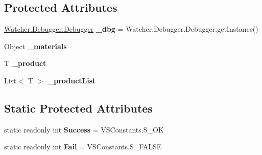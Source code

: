 \subsection*{Protected Attributes}
\begin{DoxyCompactItemize}
\item 
\hypertarget{classlib_wather_debugger_1_1_item_factory_3_01_t_01_4_a379e7c653f474dfa60015a2143bda733}{\hyperlink{class_watcher_1_1_debugger_1_1_debugger}{Watcher.\+Debugger.\+Debugger} {\bfseries \+\_\+dbg} = Watcher.\+Debugger.\+Debugger.\+get\+Instance()}\label{classlib_wather_debugger_1_1_item_factory_3_01_t_01_4_a379e7c653f474dfa60015a2143bda733}

\item 
\hypertarget{classlib_wather_debugger_1_1_item_factory_3_01_t_01_4_a1e0dcbf5d66f8fae7fddabdc60f4bc94}{Object {\bfseries \+\_\+materials}}\label{classlib_wather_debugger_1_1_item_factory_3_01_t_01_4_a1e0dcbf5d66f8fae7fddabdc60f4bc94}

\item 
\hypertarget{classlib_wather_debugger_1_1_item_factory_3_01_t_01_4_adcd525d89e1a7f17038dfddf95f8c665}{T {\bfseries \+\_\+product}}\label{classlib_wather_debugger_1_1_item_factory_3_01_t_01_4_adcd525d89e1a7f17038dfddf95f8c665}

\item 
\hypertarget{classlib_wather_debugger_1_1_item_factory_3_01_t_01_4_a7725a6c8d761884792f5700c92c138e6}{List$<$ T $>$ {\bfseries \+\_\+product\+List}}\label{classlib_wather_debugger_1_1_item_factory_3_01_t_01_4_a7725a6c8d761884792f5700c92c138e6}

\end{DoxyCompactItemize}
\subsection*{Static Protected Attributes}
\begin{DoxyCompactItemize}
\item 
\hypertarget{classlib_wather_debugger_1_1_item_factory_3_01_t_01_4_aa397f1dca5a4a9e806711edae8205602}{static readonly int {\bfseries Success} = V\+S\+Constants.\+S\+\_\+\+O\+K}\label{classlib_wather_debugger_1_1_item_factory_3_01_t_01_4_aa397f1dca5a4a9e806711edae8205602}

\item 
\hypertarget{classlib_wather_debugger_1_1_item_factory_3_01_t_01_4_a97b2fcacede6dace1a915ac57be4eeac}{static readonly int {\bfseries Fail} = V\+S\+Constants.\+S\+\_\+\+F\+A\+L\+S\+E}\label{classlib_wather_debugger_1_1_item_factory_3_01_t_01_4_a97b2fcacede6dace1a915ac57be4eeac}

\end{DoxyCompactItemize}
